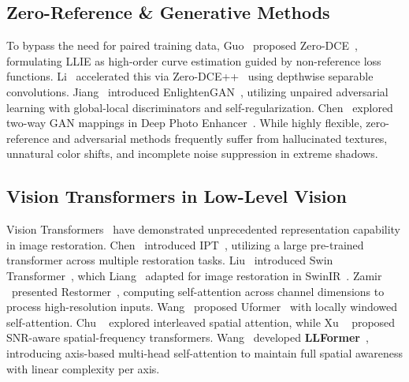 \documentclass[conference]{IEEEtran}
\begin{document}
\subsection{Zero-Reference \& Generative Methods}
To bypass the need for paired training data, Guo \etal~proposed Zero-DCE~\cite{guo2020zero}, formulating LLIE as high-order curve estimation guided by non-reference loss functions. Li \etal~accelerated this via Zero-DCE++~\cite{li2021learning} using depthwise separable convolutions. Jiang \etal~introduced EnlightenGAN~\cite{jiang2021enlightengan}, utilizing unpaired adversarial learning with global-local discriminators and self-regularization. Chen \etal~explored two-way GAN mappings in Deep Photo Enhancer~\cite{chen2018deep}. While highly flexible, zero-reference and adversarial methods frequently suffer from hallucinated textures, unnatural color shifts, and incomplete noise suppression in extreme shadows.

\subsection{Vision Transformers in Low-Level Vision}
Vision Transformers~\cite{vaswani2017attention} have demonstrated unprecedented representation capability in image restoration. Chen \etal~introduced IPT~\cite{chen2021pre}, utilizing a large pre-trained transformer across multiple restoration tasks. Liu \etal~introduced Swin Transformer~\cite{liu2021swin}, which Liang \etal~adapted for image restoration in SwinIR~\cite{liang2021swinir}. Zamir \etal~presented Restormer~\cite{zamir2022restormer}, computing self-attention across channel dimensions to process high-resolution inputs. Wang \etal~proposed Uformer~\cite{wang2022uformer} with locally windowed self-attention. Chu \etal~\cite{chu2021twins} explored interleaved spatial attention, while Xu \etal~\cite{xu2022snr} proposed SNR-aware spatial-frequency transformers. Wang \etal~developed \textbf{LLFormer}~\cite{wang2023llformer}, introducing axis-based multi-head self-attention to maintain full spatial awareness with linear complexity per axis.
\end{document}
